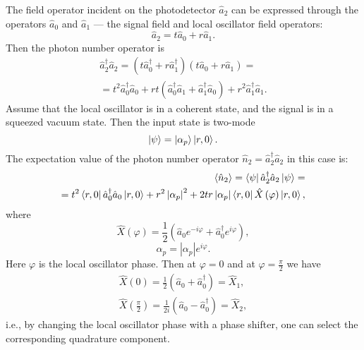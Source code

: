 The field operator incident on the photodetector $\hat{a}_2$ can be expressed
through the operators $\hat{a}_0$ and $\hat{a}_1$ — the signal field and
local oscillator field operators:
\begin{equation}
\hat{a}_2 = t \hat{a}_0 + r\hat{a}_1.
\nonumber
\end{equation}
Then the photon number operator is
\begin{eqnarray}
\hat{a}_2^{\dag}\hat{a}_2 = 
\left(t \hat{a}_0^{\dag} + r\hat{a}_1^{\dag}\right)
\left(t \hat{a}_0 + r\hat{a}_1\right) = 
\nonumber \\
=
t^2\hat{a}_0^{\dag}\hat{a}_0 + r t \left(
\hat{a}_0^{\dag}\hat{a}_1 + \hat{a}_1^{\dag}\hat{a}_0 
\right) +
r^2\hat{a}_1^{\dag}\hat{a}_1.
\nonumber
\end{eqnarray}
Assume that the local oscillator is in a coherent state, and the signal is in
a squeezed vacuum state. Then the input state is two-mode
\[
\left|\psi\right> = 
\left|\alpha_p\right> \ket{r, 0}.
\]
The expectation value of the photon number operator $\hat{n}_2 =
\hat{a}_2^{\dag}\hat{a}_2$ in this case is:
\begin{eqnarray}
\left<\hat{n}_2\right> = 
\left<\psi\right|\hat{a}_2^{\dag}\hat{a}_2\left|\psi\right> = 
\nonumber \\
=
t^2\bra{r, 0}\hat{a}_0^{\dag}\hat{a}_0\ket{r, 0} + 
r^2 \left|\alpha_p\right|^2 + 2 t r \left|\alpha_p\right|
\bra{r, 0}\hat{X}\left(\varphi\right)\ket{r, 0},
\label{eqPart3SqueezedAdd3}
\end{eqnarray}
where
\[
\hat{X}\left(\varphi\right) = \frac{1}{2}\left(
\hat{a}_0 e^{-i \varphi} +
\hat{a}_0^{\dag} e^{i \varphi}
\right),
\]
\[
\alpha_p = 
\left|\alpha_p\right|
 e^{i \varphi}.
\]
Here $\varphi$ is the local oscillator phase. Then at $\varphi = 0$ and at 
$\varphi = \frac{\pi}{2}$ we have
\begin{eqnarray}
\hat{X}\left(0\right) = 
\frac{1}{2}\left(\hat{a}_0 + \hat{a}_0^{\dag}\right) = \hat{X}_1,
\nonumber \\
\hat{X}\left(\frac{\pi}{2}\right) = 
\frac{1}{2i}\left(\hat{a}_0 - \hat{a}_0^{\dag}\right) = \hat{X}_2,
\nonumber
\end{eqnarray}
i.e., by changing the local oscillator phase with a phase shifter, one can select
the corresponding quadrature component.

